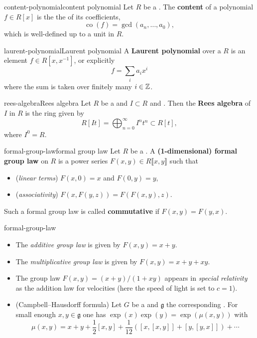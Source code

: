 \begin{topic}{content-polynomial}{content polynomial}
    Let $R$ be a . The \textbf{content} of a polynomial $f \in R[x]$ is the the  of its coefficients,
    \[ \operatorname{co}(f) = \gcd(a_n, \ldots, a_0) , \]
    which is well-defined up to a unit in $R$.
\end{topic}

\begin{topic}{laurent-polynomial}{Laurent polynomial}
    A \textbf{Laurent polynomial} over a  $R$ is an element $f \in R[x, x^{-1}]$, or explicitly
    \[ f = \sum_{i} a_i x^i \]
    where the sum is taken over finitely many $i \in \mathbb{Z}$.
\end{topic}

\begin{topic}{rees-algebra}{Rees algebra}
    Let $R$ be a  and $I \subset R$ and . Then the \textbf{Rees algebra} of $I$ in $R$ is the ring given by
    \[ R[It] = \bigoplus_{n = 0}^\infty I^n t^n \subset R[t] , \]
    where $I^0 = R$. %
\end{topic}

\begin{topic}{formal-group-law}{formal group law}
    Let $R$ be a . A \textbf{(1-dimensional) formal group law} on $R$ is a power series $F(x, y) \in R\llbracket x, y \rrbracket$ such that
    \begin{itemize}
        \item (\textit{linear terms}) $F(x, 0) = x$ and $F(0, y) = y$,
        \item (\textit{associativity}) $F(x, F(y, z)) = F(F(x, y), z)$.
    \end{itemize}
    Such a formal group law is called \textbf{commutative} if $F(x, y) = F(y, x)$.
\end{topic}

\begin{example}{formal-group-law}
    \begin{itemize}
        \item The \textit{additive group law} is given by $F(x, y) = x + y$.
        \item The \textit{multiplicative group law} is given by $F(x, y) = x + y + xy$.
        \item The group law $F(x, y) = (x + y) / (1 + xy)$ appears in \textit{special relativity} as the addition law for velocities (here the speed of light is set to $c = 1$).
        \item (Campbell--Hausdorff formula) Let $G$ be a  and $\mathfrak{g}$ the corresponding . For small enough $x, y \in \mathfrak{g}$ one has $\exp(x) \exp(y) = \exp(\mu(x, y))$ with
        \[ \mu(x, y) = x + y + \frac{1}{2} [x, y] + \frac{1}{12}([x, [x, y]] + [y, [y, x]]) + \cdots \]
    \end{itemize}
\end{example}


